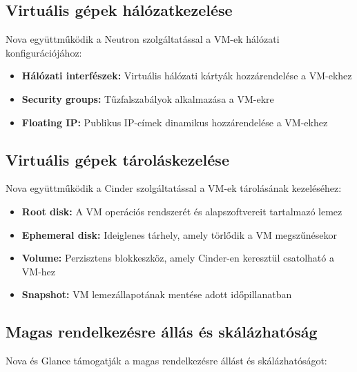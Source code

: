 \documentclass[a4paper,12pt]{article}
\begin{document}
    \subsection{Virtuális gépek hálózatkezelése}

    Nova együttműködik a Neutron szolgáltatással a VM-ek hálózati konfigurációjához:

    \begin{itemize}
        \item \textbf{Hálózati interfészek:} Virtuális hálózati kártyák hozzárendelése a VM-ekhez
        \item \textbf{Security groups:} Tűzfalszabályok alkalmazása a VM-ekre
        \item \textbf{Floating IP:} Publikus IP-címek dinamikus hozzárendelése a VM-ekhez
    \end{itemize}

    \subsection{Virtuális gépek tároláskezelése}

    Nova együttműködik a Cinder szolgáltatással a VM-ek tárolásának kezeléséhez:

    \begin{itemize}
        \item \textbf{Root disk:} A VM operációs rendszerét és alapszoftvereit tartalmazó lemez
        \item \textbf{Ephemeral disk:} Ideiglenes tárhely, amely törlődik a VM megszűnésekor
        \item \textbf{Volume:} Perzisztens blokkeszköz, amely Cinder-en keresztül csatolható a VM-hez
        \item \textbf{Snapshot:} VM lemezállapotának mentése adott időpillanatban
    \end{itemize}

    \subsection{Magas rendelkezésre állás és skálázhatóság}

    Nova és Glance támogatják a magas rendelkezésre állást és skálázhatóságot:
\end{document}
